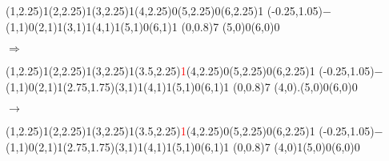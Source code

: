 \documentclass[11pt,a4paper]{article}
\begin{document}
\begin{center}
\begin{table}[ht!]
\begin{minipage}{0.15\textwidth}
\par\vspace{3\oplineheight}
\oplput(1,2.25){1}\oplput(2,2.25){1}\oplput(3,2.25){1}\oplput(4,2.25){0}\oplput(5,2.25){0}\oplput(6,2.25){1}
\oplput(-0.25,1.05){$-$}
\oplput(1,1){0}\oplput(2,1){1}\oplput(3,1){1}\oplput(4,1){1}\oplput(5,1){0}\oplput(6,1){1}
\ophline(0,0.8){7}
\oplput(5,0){0}\oplput(6,0){0}

  \end{minipage}
  \hfillx
  \begin{minipage}{0.1\textwidth}
  \centering

$ \Rightarrow $

  \end{minipage}
  \hfillx
  \begin{minipage}{0.15\textwidth}

\par\vspace{3\oplineheight}
\oplput(1,2.25){1}\oplput(2,2.25){1}\oplput(3,2.25){1}\oplput(3.5,2.25){\scriptsize \textcolor{red}{1}}\oplput(4,2.25){0}\oplput(5,2.25){0}\oplput(6,2.25){1}
\oplput(-0.25,1.05){$-$}
\oplput(1,1){0}\oplput(2,1){1}\oplput(2.75,1.75){\tiny \textcolor{red}{}}\oplput(3,1){1}\oplput(4,1){1}\oplput(5,1){0}\oplput(6,1){1}
\ophline(0,0.8){7}
\oplput(4,0){.}\oplput(5,0){0}\oplput(6,0){0}

  \end{minipage}
  \hfillx
  \begin{minipage}{0.1\textwidth}
  \centering

$ \rightarrow $

  \end{minipage}
  \hfillx
  \begin{minipage}{0.15\textwidth}

\par\vspace{3\oplineheight}
\oplput(1,2.25){1}\oplput(2,2.25){1}\oplput(3,2.25){1}\oplput(3.5,2.25){\scriptsize \textcolor{red}{1}}\oplput(4,2.25){0}\oplput(5,2.25){0}\oplput(6,2.25){1}
\oplput(-0.25,1.05){$-$}
\oplput(1,1){0}\oplput(2,1){1}\oplput(2.75,1.75){\tiny \textcolor{red}{}}\oplput(3,1){1}\oplput(4,1){1}\oplput(5,1){0}\oplput(6,1){1}
\ophline(0,0.8){7}
\oplput(4,0){1}\oplput(5,0){0}\oplput(6,0){0}

  \end{minipage}
  \hfillx
  \begin{minipage}{0.1\textwidth}
  \centering


\end{minipage}
\end{table}
\end{center}
\end{document}
